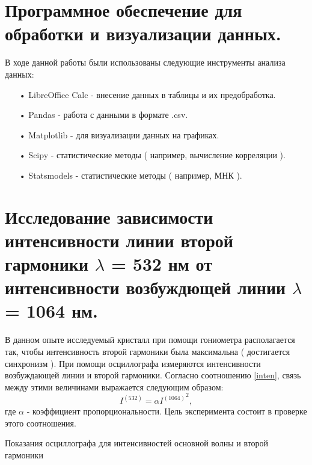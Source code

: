 \documentclass[12pt]{article}
\begin{document}
\section{Программное обеспечение для обработки и визуализации данных.}

\hspace{0.5cm}
В ходе данной работы были использованы следующие инструменты анализа данных:
\begin{itemize}
\item[•] LibreOffice Calc - внесение данных в таблицы и их предобработка.
\item[•] Pandas - работа с данными в формате .csv.
\item[•] Matplotlib - для визуализации данных на графиках.
\item[•] Scipy - статистические методы ( например, вычисление корреляции ).
\item[•] Statsmodels - статистические методы ( например, МНК ).
\end{itemize}

\section{Исследование зависимости интенсивности линии второй гармоники $\lambda$ = 532 нм от интенсивности возбуждющей линии $\lambda$ = 1064 нм.}

\hspace{0.5cm}
В данном опыте исследуемый кристалл при помощи гониометра располагается так, чтобы интенсивность второй гармоники была максимальна ( достигается синхронизм ). При помощи осциллографа измеряются интенсивности возбуждающей линии и второй гармоники. Согласно соотношению \ref{inten}, связь между этими величинами выражается следующим образом:
\begin{equation}
\label{hyp1}
I^{(532)} = \alpha{I^{(1064)}}^2,
\end{equation}
где $\alpha$ - коэффициент пропорциональности. Цель эксперимента состоит в проверке этого соотношения.

\begin{table}[h!]
\begin{center}
\caption{Показания осциллографа для интенсивностей основной волны и второй гармоники}
\label{tab1}
\end{center}
\end{table}
\end{document}
